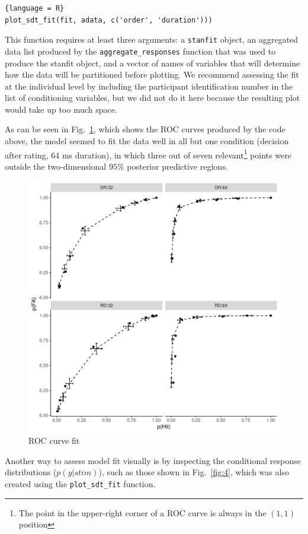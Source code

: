 \documentclass[a4paper,man,apacite,floatsintext]{apa6}
\newcommand{\code}[1]{\texttt{#1}}
\begin{document}
\begin{lstlisting}{language = R}
plot_sdt_fit(fit, adata, c('order', 'duration')))
\end{lstlisting}

This function requires at least three arguments: a \code{stanfit}
object, an aggregated data list produced by the
\code{aggregate\_responses} function that was used to produce the
stanfit object, and a vector of names of variables that will determine
how the data will be partitioned before plotting. We recommend
assessing the fit at the individual level by including the participant
identification number in the list of conditioning variables, but we
did not do it here because the resulting plot would take up too much
space.

As can be seen in Fig.~\ref{fig:3}, which shows the ROC curves
produced by the code above, the model seemed to fit the data well in
all but one condition (decision after rating, 64 ms duration), in
which three out of seven relevant\footnote{The point in the
  upper-right corner of a ROC curve is always in the $(1,1)$ position}
points were outside the two-dimensional $95\%$ posterior predictive
regions.

\begin{figure}[H]
  \centering
  \includegraphics[width=.8\linewidth]{roc_fit.pdf}
  \caption{ROC curve fit}
  \label{fig:3}
\end{figure}

Another way to assess model fit visually is by inspecting the
conditional response distributions ($p(y|stim)$), such as those shown
in Fig.~\ref{fig:4}, which was also created using the
\code{plot\_sdt\_fit} function.
\end{document}
